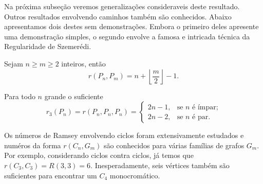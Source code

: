 Na próxima subseção veremos generalizações consideraveis deste resultado. Outros resultados envolvendo caminhos também são conhecidos. Abaixo apresentamos dois destes sem demonstrações. Embora o primeiro deles apresente uma demonstração simples, o segundo envolve a famosa e intricada técnica da Regularidade de Szemerédi.

\begin{theorem}
\label{graph:thm:path}
Sejam $n \geq m \geq 2$ inteiros, então
\[r(P_n, P_m) = n + \left \lfloor \frac{m}{2} \right \rfloor - 1.\]
\end{theorem}

\begin{theorem}
Para todo $n$ grande o suficiente
\[r_3(P_n) = r(P_n, P_n, P_n) = \begin{cases}
  2n - 1 , & \text{se } n \text{ é ímpar;} \\
  2n - 2, & \text{se } n \text{ é par.}
\end{cases}\]
\end{theorem}

Os números de Ramsey envolvendo ciclos foram extensivamente estudados e numéros da forma $r(C_n, G_m)$ são conhecidos para várias famílias de grafos $G_m$. Por exemplo, considerando ciclos contra ciclos, já temos que $r(C_3, C_3) = R(3,3) = 6$. Inesperadamente, seis vértices também são suficientes para encontrar um $C_4$ monocromático.

